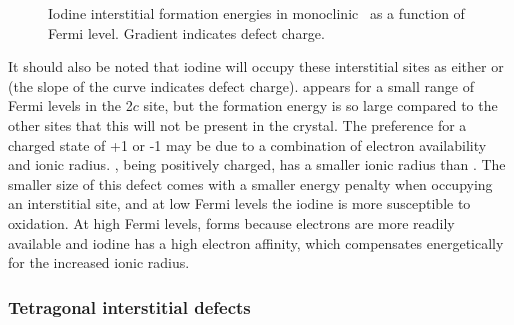 \begin{figure}[ht] %
\begin{center}
		\caption{Iodine interstitial formation energies in monoclinic \zirconia\ as a function of Fermi level. Gradient indicates defect charge.}
		\label{figure:monointer}
	\end{center}
\end{figure}

It should also be noted that iodine will occupy these interstitial sites as either  or  (the slope of the curve indicates defect charge).  appears for a small range of Fermi levels in the 2$c$ site, but the formation energy is so large compared to the other sites that this will not be present in the crystal. The preference for a charged state of +1 or -1 may be due to a combination of electron availability and ionic radius. , being positively charged, has a smaller ionic radius than . The smaller size of this defect comes with a smaller energy penalty when occupying an interstitial site, and at low Fermi levels the iodine is more susceptible to oxidation. At high Fermi levels,  forms because electrons are more readily available and iodine has a high electron affinity, which compensates energetically for the increased ionic radius.

\subsubsection{Tetragonal interstitial defects}

